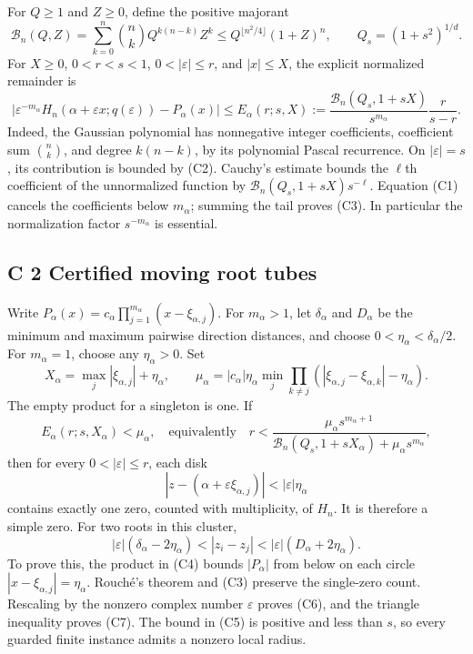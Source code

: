 \documentclass[
  11pt,
]{article}
\begin{document}
For \(Q\geq1\) and \(Z\geq0\), define the positive majorant
\[
\mathcal B_n(Q,Z)=\sum_{k=0}^n\binom nk Q^{k(n-k)}Z^k
\leq Q^{\lfloor n^2/4\rfloor}(1+Z)^n,
\qquad Q_s=(1+s^2)^{1/d}. \tag{C2}
\]
For \(X\geq0\), \(0<r<s<1\), \(0<|\varepsilon|\leq r\), and
\(|x|\leq X\), the explicit normalized remainder is
\[
\left|\varepsilon^{-m_\alpha}
 H_n(\alpha+\varepsilon x;q(\varepsilon))-P_\alpha(x)\right|
\leq E_\alpha(r;s,X)
:=\frac{\mathcal B_n(Q_s,1+sX)}{s^{m_\alpha}}\frac r{s-r}.
\tag{C3}
\]
Indeed, the Gaussian polynomial has nonnegative integer coefficients,
coefficient sum \(\binom nk\), and degree \(k(n-k)\), by its
polynomial Pascal recurrence. On \(|\varepsilon|=s\), its contribution
is bounded by (C2). Cauchy's estimate bounds the \(\ell\)th coefficient
of the unnormalized function by
\(\mathcal B_n(Q_s,1+sX)s^{-\ell}\). Equation (C1) cancels the
coefficients below \(m_\alpha\); summing the tail proves (C3).
In particular the normalization factor \(s^{-m_\alpha}\) is essential.

\subsection{C 2 Certified moving root tubes}

Write \(P_\alpha(x)=c_\alpha\prod_{j=1}^{m_\alpha}(x-\xi_{\alpha,j})\).
For \(m_\alpha>1\), let \(\delta_\alpha\) and \(D_\alpha\) be the
minimum and maximum pairwise direction distances, and choose
\(0<\eta_\alpha<\delta_\alpha/2\). For \(m_\alpha=1\), choose any
\(\eta_\alpha>0\). Set
\[
X_\alpha=\max_j|\xi_{\alpha,j}|+\eta_\alpha,\qquad
\mu_\alpha=|c_\alpha|\eta_\alpha
 \min_j\prod_{k\ne j}(|\xi_{\alpha,j}-\xi_{\alpha,k}|-\eta_\alpha).
\tag{C4}
\]
The empty product for a singleton is one. If
\[
E_\alpha(r;s,X_\alpha)<\mu_\alpha,
\quad\text{equivalently}\quad
r<\frac{\mu_\alpha s^{m_\alpha+1}}
 {\mathcal B_n(Q_s,1+sX_\alpha)+\mu_\alpha s^{m_\alpha}},
\tag{C5}
\]
then for every \(0<|\varepsilon|\leq r\), each disk
\[
|z-(\alpha+\varepsilon\xi_{\alpha,j})|<|\varepsilon|\eta_\alpha
\tag{C6}
\]
contains exactly one zero, counted with multiplicity, of \(H_n\).
It is therefore a simple zero. For two roots in this cluster,
\[
|\varepsilon|(\delta_\alpha-2\eta_\alpha)
< |z_i-z_j|
< |\varepsilon|(D_\alpha+2\eta_\alpha). \tag{C7}
\]
To prove this, the product in (C4) bounds \(|P_\alpha|\) from below
on each circle \(|x-\xi_{\alpha,j}|=\eta_\alpha\). Rouch\'e's theorem
and (C3) preserve the single-zero count. Rescaling by the nonzero
complex number \(\varepsilon\) proves (C6), and the triangle inequality
proves (C7). The bound in (C5) is positive and less than \(s\), so every
guarded finite instance admits a nonzero local radius.
\end{document}
